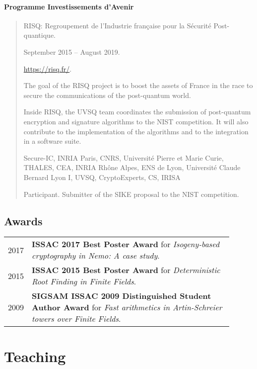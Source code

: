 \documentclass{book}
\begin{document}
\paragraph{Programme Investissements d'Avenir}
\begin{quote}
  \begin{description}
    \setlength{\itemsep}{-0.5ex}
  \item[Project:] RISQ: Regroupement de l’Industrie française pour la
    Sécurité Post-quantique.
  \item[Duration:] September 2015 -- August 2019.
  \item[WWW:] \url{https://risq.fr/}.
  \item[Description:] The goal of the RISQ project is to boost the
    assets of France in the race to secure the communications of the
    post-quantum world. 
    
    Inside RISQ, the UVSQ team coordinates the submission of
    post-quantum encryption and signature algorithms to the NIST
    competition. It will also contribute to the implementation of the
    algorithms and to the integration in a software suite.
  \item[Participants:] Secure-IC, INRIA Paris, CNRS, Université Pierre
    et Marie Curie, THALES, CEA, INRIA Rhône Alpes, ENS de Lyon,
    Université Claude Bernard Lyon I, UVSQ, CryptoExperts, CS, IRISA
  \item[Role:] Participant. Submitter of the SIKE proposal to the NIST
    competition.
  \end{description}
\end{quote}

\subsection*{Awards}

\begin{tabular}{l p{0.9\linewidth}}
  2017 & \textbf{ISSAC 2017 Best Poster Award} for
         \emph{Isogeny-based cryptography in Nemo: A case study}.\\
  2015 & \textbf{ISSAC 2015 Best Poster Award} for \emph{Deterministic Root
         Finding in Finite Fields}.\\
  2009 & \textbf{SIGSAM ISSAC 2009 Distinguished Student Author Award}
         for \emph{Fast arithmetics in Artin-Schreier towers over Finite Fields}.
\end{tabular}

\section*{Teaching}
\end{document}
